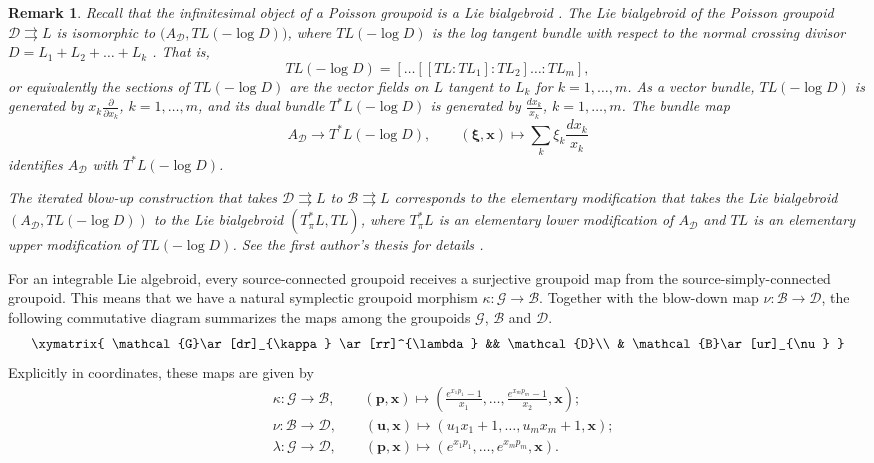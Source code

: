 \documentclass{amsart}
\newtheorem{remark}[theorem]{Remark}
\numberwithin{equation}{section}
\newcommand{\bfp}{{\boldsymbol{p}}}
\newcommand{\bfu}{{\boldsymbol{u}}}
\newcommand{\bfx}{{\boldsymbol{x}}}
\newcommand{\bfxi}{\boldsymbol{\xi}}
\newcommand{\cB}{\mathcal{B}}
\newcommand{\cD}{\mathcal{D}}
\newcommand{\cG}{\mathcal{G}}
\newcommand{\rra}{\rightrightarrows}
\begin{document}
\begin{remark}
  Recall that the infinitesimal object of a Poisson groupoid is a Lie bialgebroid \cite{MR1262213}.
  The Lie bialgebroid of the Poisson groupoid $\cD \rra L$ is isomorphic to $\big(A_\cD, TL(-\log D)\big)$, where $TL(-\log D)$ is the log tangent bundle with respect to the normal crossing divisor $D = L_1 + L_2 + \ldots + L_k$ \cite{MR3214314}.
  That is,
  \[TL(-\log D) = [\ldots[[TL\!:\!TL_1]\!:\!TL_2] \ldots \!:\!TL_m],\]
  or equivalently the sections of $TL(-\log D)$ are the vector fields on $L$ tangent to $L_k$ for $k = 1, \ldots, m$.
  As a vector bundle, $TL(-\log D)$ is generated by $x_k \frac{\partial}{\partial x_k}$, $k = 1, \ldots, m$, and its dual bundle $T^*L(-\log D)$ is generated by $\frac{d x_k}{x_k}$, $k = 1, \ldots, m$.
  The bundle map
  \[A_\cD \to T^*L(-\log D), \qquad (\bfxi, \bfx) \mapsto \sum_k\xi_k\frac{d x_k}{x_k}\]
  identifies $A_\cD$ with $T^*L(-\log D)$.

  The iterated blow-up construction that takes $\cD \rra L$ to $\cB \rra L$ corresponds to the elementary modification that takes the Lie bialgebroid $(A_\cD, TL(-\log D))$ to the Lie bialgebroid $(T^*_\pi L, TL)$, where $T^*_\pi L$ is an elementary lower modification of $A_\cD$ and $TL$ is an elementary upper modification of $TL(-\log D)$.
  See the first author's thesis for details \cite{MR3312911}.
\end{remark}

For an integrable Lie algebroid, every source-connected groupoid receives a surjective groupoid map from the source-simply-connected groupoid.
This means that we have a natural symplectic groupoid morphism $\kappa:\cG\to\cB$.
Together with the blow-down map $\nu:\cB\to\cD$, the following commutative diagram summarizes the maps among the groupoids $\cG$, $\cB$ and $\cD$.
\begin{equation} 
  \label{eq:LGpdCD}
  \xymatrix{
    \cG  \ar[dr]_{\kappa} \ar[rr]^{\lambda} && \cD \\
      & \cB \ar[ur]_{\nu}
  }
\end{equation}
Explicitly in coordinates, these maps are given by
\begin{align}
  & \kappa: \cG \to \cB, \qquad (\bfp, \bfx) \mapsto \left(\frac{e^{x_1p_1}-1}{x_1}, \ldots, \frac{e^{x_mp_m}-1}{x_2}, \bfx\right); \\
  & \nu: \cB \to \cD, \qquad (\bfu, \bfx) \mapsto (u_1x_1+1, \ldots, u_mx_m+1, \bfx); \\
  & \lambda: \cG \to \cD, \qquad (\bfp, \bfx) \mapsto (e^{x_1p_1}, \ldots, e^{x_mp_m}, \bfx).
\end{align}
\end{document}
